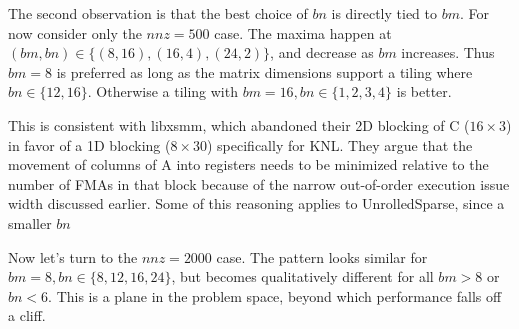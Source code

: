 The second observation is that the best choice of $bn$ is directly tied to $bm$. For now consider only the $nnz=500$ case. The maxima happen at $(bm,bn) \in \{(8,16), (16,4), (24,2)\}$, and decrease as $bm$ increases. Thus $bm=8$ is preferred as long as the matrix dimensions support a tiling where $bn \in \{12,16\}$. Otherwise a tiling with $bm=16, bn\in\{1,2,3,4\}$ is better. 

This is consistent with libxsmm, which abandoned their 2D blocking of C ($16 \times 3$) in favor of a 1D blocking ($8 \times 30$) specifically for \gls{KNL}. They argue that the movement of columns of A into registers needs to be minimized relative to the number of FMAs in that block because of the narrow out-of-order execution issue width discussed earlier. Some of this reasoning applies to UnrolledSparse, since a smaller $bn$ 

Now let's turn to the $nnz=2000$ case. The pattern looks similar for $bm=8, bn\in\{8,12,16,24\}$, but becomes qualitatively different for all $bm > 8$ or $bn < 6$. This is a plane in the problem space, beyond which performance falls off a cliff. 


